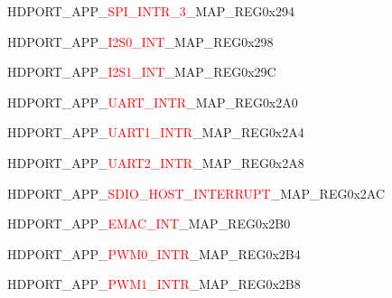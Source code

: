 \vspace{-3em}
\begin{register}{H}{DPORT\_APP\_\textcolor{red}{SPI\_INTR\_3}\_MAP\_REG}{0x294}\label{regdesc:APPSPIINTR3MAPREG}
\end{register}
\vspace{-3em}
\begin{register}{H}{DPORT\_APP\_\textcolor{red}{I2S0\_INT}\_MAP\_REG}{0x298}\label{regdesc:APPI2S0INTMAPREG}
\end{register}
\vspace{-3em}
\begin{register}{H}{DPORT\_APP\_\textcolor{red}{I2S1\_INT}\_MAP\_REG}{0x29C}\label{regdesc:APPI2S1INTMAPREG}
\end{register}
\vspace{-3em}
\begin{register}{H}{DPORT\_APP\_\textcolor{red}{UART\_INTR}\_MAP\_REG}{0x2A0}\label{regdesc:APPUARTINTRMAPREG}
\end{register}
\vspace{-3em}
\begin{register}{H}{DPORT\_APP\_\textcolor{red}{UART1\_INTR}\_MAP\_REG}{0x2A4}\label{regdesc:APPUART1INTRMAPREG}
\end{register}
\vspace{-3em}
\begin{register}{H}{DPORT\_APP\_\textcolor{red}{UART2\_INTR}\_MAP\_REG}{0x2A8}\label{regdesc:APPUART2INTRMAPREG}
\end{register}
\vspace{-3em}
\begin{register}{H}{DPORT\_APP\_\textcolor{red}{SDIO\_HOST\_INTERRUPT}\_MAP\_REG}{0x2AC}\label{regdesc:APPSDIOHOSTINTERRUPTMAPREG}
\end{register}
\vspace{-3em}
\begin{register}{H}{DPORT\_APP\_\textcolor{red}{EMAC\_INT}\_MAP\_REG}{0x2B0}\label{regdesc:APPEMACINTMAPREG}
\end{register}
\vspace{-3em}
\begin{register}{H}{DPORT\_APP\_\textcolor{red}{PWM0\_INTR}\_MAP\_REG}{0x2B4}\label{regdesc:APPPWM0INTRMAPREG}
\end{register}
\vspace{-3em}
\begin{register}{H}{DPORT\_APP\_\textcolor{red}{PWM1\_INTR}\_MAP\_REG}{0x2B8}\label{regdesc:APPPWM1INTRMAPREG}
\end{register}
\vspace{-3em}

